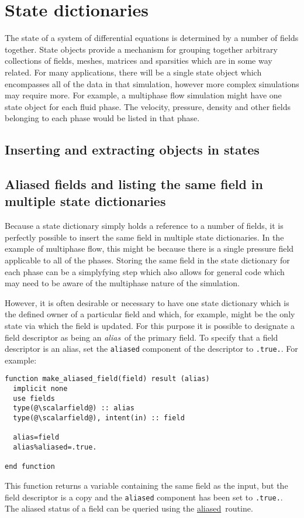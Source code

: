 \documentclass[a4paper, 11pt]{book}
\newcommand{\targetlabel}[1]{\hypertarget{#1}{}\label{#1}}
\begin{document}
\chapter{State dictionaries}\targetlabel{chap:state}

The state of a system of differential equations is determined by a number of
fields together. State objects provide a mechanism for grouping together
arbitrary collections of fields, meshes, matrices and sparsities which are
in some way related. For many applications, there will be a single state
object which encompasses all of the data in that simulation, however more
complex simulations may require more. For example, a multiphase flow
simulation might have one state object for each fluid phase. The velocity,
pressure, density and other fields belonging to each phase would be listed
in that phase.

\section{Inserting and extracting objects in states}



\section{Aliased fields and listing the same field in multiple state
  dictionaries}\label{sec:alias} 

Because a state dictionary simply holds a reference to a number of fields,
it is perfectly possible to insert the same field in multiple state
dictionaries. In the example of multiphase flow, this might be because there
is a single pressure field applicable to all of the phases. Storing the
same field in the state dictionary for each phase can be a simplyfying step
which also allows for general code which may need to be aware of the
multiphase nature of the simulation.

However, it is often desirable or necessary to have one state dictionary
which is the defined owner of a particular field and which, for example,
might be the only state via which the field is updated. For this purpose it
is possible to designate a field descriptor as being an \emph{alias}\ of the
primary field. To specify that a field descriptor is an alias, set the
\lstinline+aliased+ component of the descriptor to \lstinline+.true.+. For
example:
\begin{lstlisting}
function make_aliased_field(field) result (alias)
  implicit none
  use fields
  type(@\scalarfield@) :: alias 
  type(@\scalarfield@), intent(in) :: field 
  
  alias=field
  alias%aliased=.true.

end function
\end{lstlisting}
This function returns a variable containing the same field as the input, but
the field descriptor is a copy and the \lstinline+aliased+ component has
been set to \lstinline+.true.+. The aliased status of a field can be queried
using the \hyperlink{proc:aliased}{aliased}\ routine. 
\end{document}
